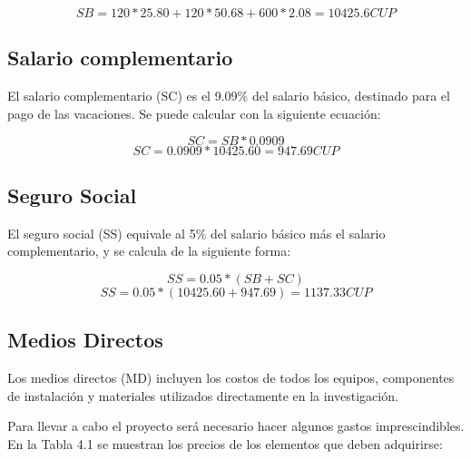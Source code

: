 \begin{equation}
    \label{eq:salary_basico_total}
    SB = 120 * 25.80 + 120 * 50.68 + 600 * 2.08 = 10425.6 CUP
\end{equation}


\subsection*{Salario complementario}

El salario complementario (SC) es el 9.09\% del salario básico, destinado para el pago de las
vacaciones. Se puede calcular con la siguiente ecuación:

\begin{equation}
    \label{eq:salary_complementary}
    SC = SB * 0.0909
\end{equation}
\begin{equation}
    \label{eq:salary_complementary_total}
    SC=0.0909*10425.60=947.69 CUP
\end{equation}

\subsection*{Seguro Social}

El seguro social (SS) equivale al 5\% del salario básico más el salario complementario, y se
calcula de la siguiente forma:

\begin{equation}
    \label{eq:social_security}
    SS = 0.05 * (SB + SC)
\end{equation}
\begin{equation}
    \label{eq:social_security_total}
    SS=0.05*(10425.60+947.69)=1137.33 CUP
\end{equation}

\subsection*{Medios Directos}

Los medios directos (MD) incluyen los costos de todos los equipos, componentes de instalación y
materiales utilizados directamente en la investigación.


Para llevar a cabo el proyecto será necesario hacer algunos gastos imprescindibles. En la Tabla 4.1
se muestran los precios de los elementos que deben adquirirse:

